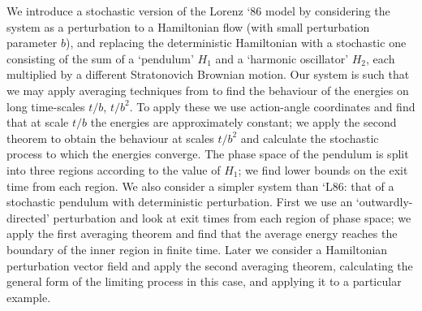 \documentclass[12pt]{report}
\begin{document}
We introduce a stochastic version of the Lorenz `86 model by considering the system as a perturbation to a Hamiltonian flow (with small perturbation parameter $b$), and replacing the deterministic Hamiltonian with a stochastic one consisting of the sum of a `pendulum' $H_{1}$ and a `harmonic oscillator' $H_{2}$, each multiplied by a different Stratonovich Brownian motion. Our system is such that we may apply averaging techniques from \cite{XM} to find the behaviour of the energies on long time-scales $t/b$, $t/b^{2}$. To apply these we use action-angle coordinates and find that at scale $t/b$ the energies are approximately constant; we apply the second theorem to obtain the behaviour at scales $t/b^{2}$ and calculate the stochastic process to which the energies converge. The phase space of the pendulum is split into three regions according to the value of $H_{1}$; we find lower bounds on the exit time from each region. We also consider a simpler system than `L86: that of a stochastic pendulum with deterministic perturbation. First we use an `outwardly-directed' perturbation and look at exit times from each region of phase space; we apply the first averaging theorem and find that the average energy reaches the boundary of the inner region in finite time. Later we consider a Hamiltonian perturbation vector field and apply the second averaging theorem, calculating the general form of the limiting process in this case, and applying it to a particular example. 
\end{document}
